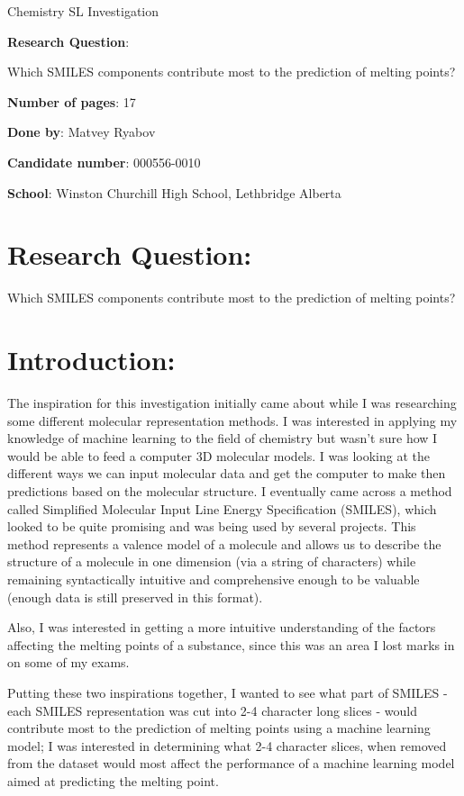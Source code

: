 \documentclass[11pt]{article}
\date{\today}
\title{}
\begin{document}
\begin{center}
\huge
Chemistry SL Investigation

\large
\textbf{Research Question}:

Which SMILES components contribute most to the prediction of melting points?

\textbf{Number of pages}: 17

\textbf{Done by}: Matvey Ryabov

\textbf{Candidate number}: 000556-0010

\textbf{School}: Winston Churchill High School, Lethbridge Alberta 
\end{center}
\pagebreak
\setcounter{tocdepth}{2}
\tableofcontents
\section{Research Question:}
\label{sec:org398397d}
Which SMILES components contribute most to the prediction of melting points?
\section{Introduction:}
\label{sec:org6960b91}
The inspiration for this investigation initially came about while I was researching some different molecular representation methods. I was interested in applying my knowledge of machine learning to 
the field of chemistry but wasn't sure how I would be able to feed a computer 3D molecular models. I was looking at the different ways we can input molecular data and get the computer to make then predictions based on 
the molecular structure. I eventually came across a method
called Simplified Molecular Input Line Energy Specification (SMILES), which looked to be quite promising and was being used by several projects. This method represents a valence model of a molecule and 
allows us to describe the structure of a molecule in one dimension (via a string of characters) while remaining syntactically intuitive and comprehensive enough to be valuable (enough data is still preserved in this format).

Also, I was interested in getting a more intuitive understanding of the factors affecting the melting points of a substance, 
since this was an area I lost marks in on some of my exams.

Putting these two inspirations together, I wanted to see what part of SMILES - each SMILES representation was cut into 2-4 character long slices -
would contribute most to the prediction of melting points using a machine learning model; I was interested in determining what 2-4 character slices, when removed from 
the dataset would most affect the performance of a machine learning model aimed at predicting the melting point. 
\end{document}
